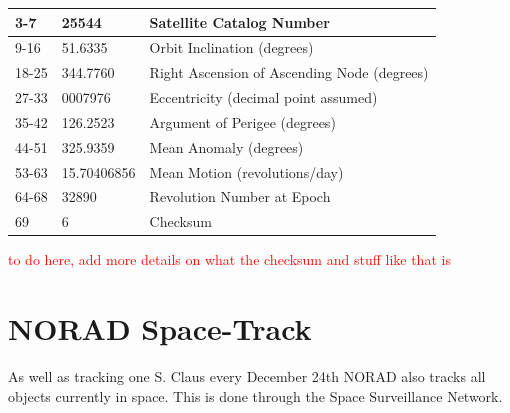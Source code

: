 \documentclass[12pt]{report}
\begin{document}
\begin{table}[h!]
{\begin{tabular}{|l|l|l|}
				3-7                                     & 25544                                   & Satellite Catalog Number                                                        \\ \hline
				9-16                                    & 51.6335                                 & Orbit Inclination (degrees)                                                     \\ \hline
				18-25                                   & 344.7760                                & Right Ascension of Ascending Node (degrees)                                     \\ \hline
				27-33                                   & 0007976                                 & Eccentricity (decimal point assumed)                                            \\ \hline
				35-42                                   & 126.2523                                & Argument of Perigee (degrees)                                                   \\ \hline
				44-51                                   & 325.9359                                & Mean Anomaly (degrees)                                                          \\ \hline
				53-63                                   & 15.70406856                             & Mean Motion (revolutions/day)                                                   \\ \hline
				64-68                                   & 32890                                   & Revolution Number at Epoch                                                      \\ \hline
				69                                      & 6                                       & Checksum                                                                        \\ \hline
			\end{tabular}%
		}
	\end{table}
	
	

	\textcolor{red}{to do here, add more details on what the checksum and stuff like that is}
	
	\par 
		\doublespacing
  
	

	\section{NORAD Space-Track}	
	As well as tracking one S. Claus every December 24th\cite{noradSC} NORAD also tracks all objects currently in space. This is done through the Space Surveillance Network\cite{ssncltrak}.
	
\end{document}
